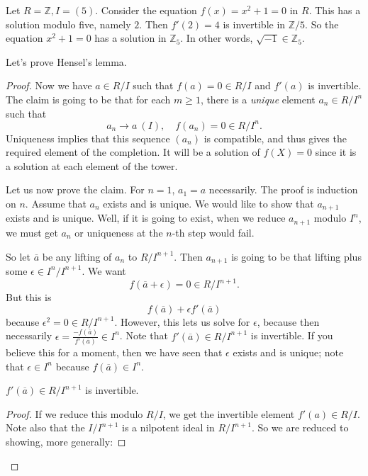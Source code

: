 \begin{example} 
Let $R = \mathbb{Z}, I = (5)$. Consider the equation $f(x) = x^2 + 1 = 0$ in $R$. This
has a solution modulo five, namely $2$. Then $f'(2) = 4$ is invertible in
$\mathbb{Z}/5$. So the equation $x^2 + 1 = 0$ has a solution in $\mathbb{Z}_5$.
In other words, $\sqrt{-1} \in \mathbb{Z}_5$.
\end{example} 

Let's prove Hensel's lemma.
\begin{proof} 
Now we have $a \in R/I$ such that $f(a) = 0 \in R/I$ and $f'(a)$ is invertible. 
The claim is going to be that for each $m \geq 1$, there is a \emph{unique}
element $a_n \in R/I^n$ such that
\[ a_n \to a \ (I), \quad f(a_n)  = 0 \in R/I^n.  \]
Uniqueness implies that this sequence $(a_n)$ is compatible, and thus gives the
required element of the completion.
It will be a solution of $f(X) = 0$ since it is a solution at each element of
the tower.

Let us now prove the claim.
For $n=1$, $a_1 = a$ necessarily. 
The proof is induction on $n$. Assume that $a_n$ exists and is unique. We would like to show
that $a_{n+1}$ exists and is unique. Well, if it is going to exist, when we
reduce $a_{n+1}$ modulo $I^n$, we must get $a_n$ or uniqueness at the $n$-th
step would fail. 

So let $\overline{a}$ be any lifting of $a_n$ to $R/I^{n+1}$.  Then $a_{n+1}$
is going to be that lifting plus some $\epsilon \in I^n/I^{n+1}$. We want
\[ f(\overline{a} + \epsilon) = 0 \in R/I^{n+1}.  \]
But this is 
\[ f(\overline{a}) +  \epsilon f'(\overline{a})  \]
because $\epsilon^2 = 0 \in R/I^{n+1}$. However, this lets us solve for
$\epsilon$, because then necessarily $\epsilon =
\frac{-f(\overline{a})}{f'(\overline{a})} \in I^n$.
Note that $f'(\overline{a}) \in R/I^{n+1}$ is invertible. If you believe this
for a moment, then we have seen that $\epsilon$ exists and is unique; note
that $\epsilon \in I^n$ because $f(\overline{a}) \in I^n$. 


\begin{lemma} 
$f'(\overline{a}) \in R/I^{n+1}$ is invertible.
\end{lemma} 
\begin{proof} 
If we reduce this modulo $R/I$, we get the invertible element $f'(a) \in R/I$.
Note also that the $I/I^{n+1}$ is a nilpotent ideal in $R/I^{n+1}$. So we are
reduced to showing, more generally:


\end{proof}
\end{proof}
